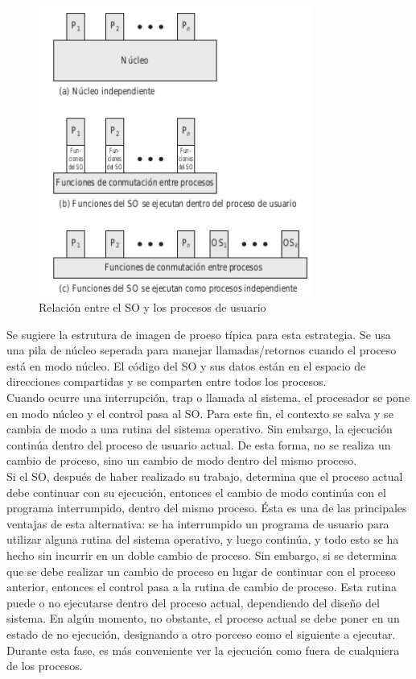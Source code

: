 \documentclass{article}
\begin{document}
				\begin{figure}
				\caption{Relación entre el SO y los procesos de usuario}
				\label{figura2.16:relaciónSO-procesos}
				\centering
				\includegraphics[width=0.8\textwidth, scale=1]{tema_2_figura16.png}
				\end{figure}
				
				Se sugiere la estrutura de imagen de proeso típica para esta estrategia. Se usa una pila de núcleo seperada para manejar llamadas/retornos cuando el proceso está en modo núcleo. El código del SO y sus datos están en el espacio de direcciones compartidas y se comparten entre todos los procesos.\\
				
				Cuando ocurre una interrupción, trap o llamada al sistema, el procesador se pone en modo núcleo y el control pasa al SO. Para este fin, el contexto se salva y se cambia de
modo a una rutina del sistema operativo. Sin embargo, la ejecución continúa dentro del proceso de usuario actual. De esta forma, no se realiza un cambio de proceso, sino un cambio de modo dentro del mismo proceso. \\
				
				Si el SO, después de haber realizado su trabajo, determina que el proceso actual debe continuar con su ejecución, entonces el cambio de modo continúa con el programa interrumpido, dentro del mismo proceso. Ésta es una de las principales ventajas de esta alternativa: se ha interrumpido un programa de usuario para utilizar alguna rutina del sistema operativo, y luego continúa, y todo esto se ha hecho sin incurrir en un doble cambio de proceso. Sin embargo, si se
determina que se debe realizar un cambio de proceso en lugar de continuar con el proceso anterior, entonces el control pasa a la rutina de cambio de proceso. Esta rutina puede o no ejecutarse dentro del proceso actual, dependiendo del diseño del sistema. En algún momento, no obstante, el proceso actual se debe poner en un estado de no ejecución, designando a otro porceso como el siguiente a ejecutar. Durante esta fase, es más conveniente ver la ejecución como fuera de cualquiera de los procesos. \\
					
\end{document}
